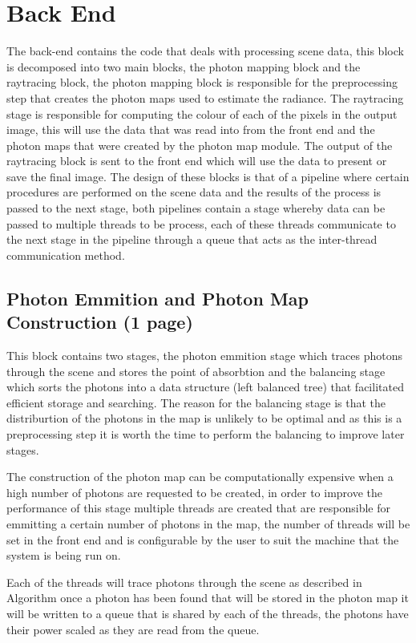 \section{Back End}
The back-end contains the code that deals with processing scene data, this block is decomposed into
two main blocks, the photon mapping block and the raytracing block, the photon mapping block is responsible
for the preprocessing step that creates the photon maps used to estimate the radiance. The raytracing stage
is responsible for computing the colour of each of the pixels in the output image, this will use the data
that was read into from the front end and the photon maps that were created by the photon map module. The
output of the raytracing block is sent to the front end which will use the data to present or save the final
image. The design of these blocks is that of a pipeline where certain procedures are performed on the scene
data and the results of the process is passed to the next stage, both pipelines contain a stage whereby
data can be passed to multiple threads to be process, each of these threads communicate to the next
stage in the pipeline through a queue that acts as the inter-thread communication method.

\subsection{Photon Emmition and Photon Map Construction (1 page)}
This block contains two stages, the photon emmition stage which traces photons through the scene and stores
the point of absorbtion and the balancing stage which sorts the photons into a data structure (left balanced
tree) that facilitated efficient storage and searching. The reason for the balancing stage is that the
distriburtion of the photons in the map is unlikely to be optimal \cite{JensenBook} and as this is a
preprocessing step it is worth the time to perform the balancing to improve later stages.

The construction of the photon map can be computationally expensive when a high number of photons are
requested to be created, in order to improve the performance of this stage multiple threads are created
that are responsible for emmitting a certain number of photons in the map, the number of threads will be
set in the front end and is configurable by the user to suit the machine that the system is being run on.

Each of the threads will trace photons through the scene as described in Algorithm
once a photon has been found that will be stored in the photon map it will be written to a queue that is shared
by each of the threads, the photons have their power scaled as they are read from the queue.

